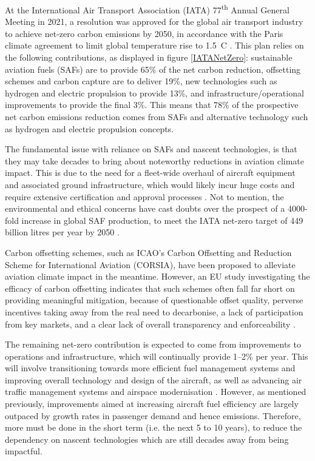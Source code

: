 At the International Air Transport Association (IATA) 77\textsuperscript{th} Annual General Meeting in 2021, a resolution was approved for the global air transport industry to achieve net-zero carbon emissions by 2050, in accordance with the Paris climate agreement to limit global temperature rise to 1.5\textdegree~C \cite{IATANetZero}. This plan relies on the following contributions, as displayed in figure \ref{IATANetZero}: sustainable aviation fuels (SAFs) are to provide 65\% of the net carbon reduction, offsetting schemes and carbon capture are to deliver 19\%, new technologies such as hydrogen and electric propulsion to provide 13\%, and infrastructure/operational improvements to provide the final 3\%. This means that 78\% of the prospective net carbon emissions reduction comes from SAFs and alternative technology such as hydrogen and electric propulsion concepts. 

The fundamental issue with reliance on SAFs and nascent technologies, is that they may take decades to bring about noteworthy reductions in aviation climate impact. This is due to the need for a fleet-wide overhaul of aircraft equipment and associated ground infrastructure, which would likely incur huge costs and require extensive certification and approval processes \cite{ICF2021}. Not to mention, the environmental and ethical concerns have cast doubts over the prospect of a 4000-fold increase in global SAF production, to meet the IATA net-zero target of 449 billion litres per year by 2050 \cite{IATANetZero, Henoi2022}. 

Carbon offsetting schemes, such as ICAO's Carbon Offsetting and Reduction Scheme for International Aviation (CORSIA), have been proposed to alleviate aviation climate impact in the meantime. However, an EU study investigating the efficacy of carbon offsetting indicates that such schemes often fall far short on providing meaningful mitigation, because of questionable offset quality, perverse incentives taking away from the real need to decarbonise, a lack of participation from key markets, and a clear lack of overall transparency and enforceability \cite{TandE2021, TandE2020}.

The remaining net-zero contribution is expected to come from improvements to operations and infrastructure, which will continually provide 1--2\% per year. This will involve transitioning towards more efficient fuel management systems and improving overall technology and design of the aircraft, as well as advancing air traffic management systems and airspace modernisation \cite{Peeters2016}. However, as mentioned previously, improvements aimed at increasing aircraft fuel efficiency are largely outpaced by growth rates in passenger demand and hence emissions. Therefore, more must be done in the short term (i.e. the next 5 to 10 years), to reduce the dependency on nascent technologies which are still decades away from being impactful.

